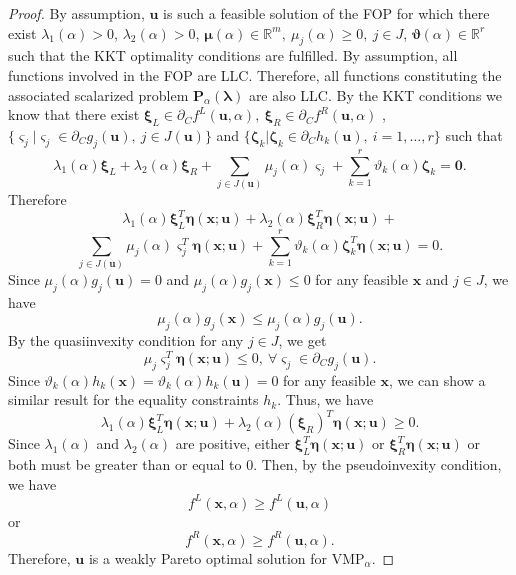 \documentclass{article}
\theoremstyle{definition}
\begin{document}
\begin{proof}  By assumption, $\boldsymbol u$ is such a feasible solution of the FOP for which there exist $\lambda_1( \alpha) > 0$, $\lambda_2( \alpha) > 0$, $\boldsymbol { \mu}( \alpha) \in \mathbb R^{m},\  \mu_j( \alpha) \geq 0,\ j \in J$, $\boldsymbol { \vartheta}( \alpha) \in \mathbb R^r$ such that the KKT optimality conditions are fulfilled. By assumption, all functions involved in the FOP are LLC. Therefore, all functions constituting the associated scalarized problem $\boldsymbol P_{\alpha}({\boldsymbol \lambda})$ are also LLC. By the KKT conditions we know that there exist $\boldsymbol \xi_L \in \partial_C f^L(\boldsymbol u,  \alpha),\ \boldsymbol \xi_R \in \partial_C f^R(\boldsymbol u,  \alpha)$ ,$\{\boldsymbol \varsigma_j | \boldsymbol \varsigma_j \in \partial_Cg_j(\boldsymbol u),\ j \in J(\boldsymbol{u})\}$ and $\{\boldsymbol \zeta_k | \boldsymbol \zeta_k \in \partial_Ch_k(\boldsymbol u),\ i=1,\dots,r\}$ such that
$$ \lambda_1( \alpha) \boldsymbol \xi_L +  \lambda_2( \alpha) \boldsymbol \xi_R + \sum_{j \in J(\boldsymbol{u})} \mu_j( \alpha) \boldsymbol \varsigma_j + \sum_{k=1}^r \vartheta_k( \alpha) \boldsymbol \zeta_k = \boldsymbol 0.$$
Therefore
$$ \lambda_1( \alpha) \boldsymbol \xi_{L}^T \boldsymbol \eta(\boldsymbol x; \boldsymbol u) +  \lambda_2( \alpha) \boldsymbol \xi_{R}^T \boldsymbol \eta(\boldsymbol x; \boldsymbol u) + $$
$$ \sum_{j\in J(\boldsymbol{u})} \mu_j( \alpha) \boldsymbol \varsigma_j^T \boldsymbol \eta(\boldsymbol x; \boldsymbol u)+ \sum_{k=1}^r \vartheta_k( \alpha) \boldsymbol \zeta^T_k \boldsymbol \eta(\boldsymbol x; \boldsymbol u) = 0.$$
Since $ \mu_j( \alpha) g_j(\boldsymbol u) = 0$ and $ \mu_j( \alpha) g_j(\boldsymbol x) \leq 0$ for any feasible $\boldsymbol x$ and $j\in J$, we have
$$ \mu_j( \alpha) g_j(\boldsymbol x) \leq  \mu_j( \alpha) g_j(\boldsymbol u).$$
By the quasiinvexity condition for any $j\in J$, we get
$$\mu_j \boldsymbol \varsigma_j^T \boldsymbol \eta(\boldsymbol x; \boldsymbol u) \leq 0,\ \forall \boldsymbol \varsigma_j \in \partial_Cg_j(\boldsymbol{u}).$$
Since $ \vartheta_k( \alpha) h_k(\boldsymbol x) =  \vartheta_k( \alpha) h_k(\boldsymbol u) = 0$ for any feasible $\boldsymbol x$, we can show a similar result for the equality constraints $h_k$. Thus, we have
$$ \lambda_1( \alpha) \boldsymbol \xi_{L}^T \boldsymbol \eta(\boldsymbol x; \boldsymbol u) +  \lambda_2( \alpha) (\boldsymbol \xi_{R})^T \boldsymbol \eta(\boldsymbol x; \boldsymbol u) \geq 0.$$
Since $ \lambda_1( \alpha)$ and $ \lambda_2( \alpha)$ are positive, either $\boldsymbol \xi_{L}^T \boldsymbol \eta(\boldsymbol x; \boldsymbol u)$ or $\boldsymbol \xi_{R}^T \boldsymbol \eta(\boldsymbol x; \boldsymbol u)$ or both must be greater than or equal to 0. Then, by the pseudoinvexity condition, we have
$$f^L(\boldsymbol x,  \alpha) \geq f^L(\boldsymbol u,  \alpha)$$
or
$$f^R(\boldsymbol x,  \alpha) \geq f^R(\boldsymbol u,  \alpha).$$
Therefore, $\boldsymbol u$ is a weakly Pareto optimal solution for VMP$_{\alpha}$.
\end{proof}
\end{document}
